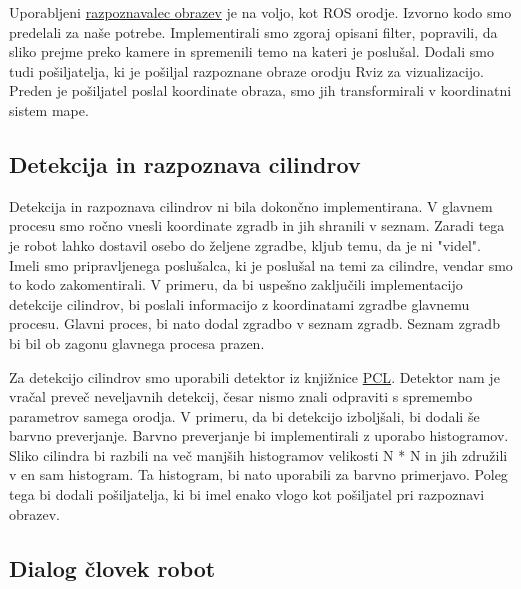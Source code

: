 \documentclass[a4paper,11pt]{article}
\begin{document}
Uporabljeni \href{http://wiki.ros.org/face_recognition}{razpoznavalec obrazev} je na voljo, kot ROS orodje. Izvorno kodo smo predelali za naše potrebe. Implementirali smo zgoraj opisani filter, popravili, da sliko prejme preko kamere in spremenili temo na kateri je poslušal. Dodali smo tudi pošiljatelja, ki je pošiljal razpoznane obraze orodju Rviz za vizualizacijo. Preden je pošiljatel poslal koordinate obraza, smo jih transformirali v koordinatni sistem mape.

\subsection{Detekcija in razpoznava cilindrov}

Detekcija in razpoznava cilindrov ni bila dokončno implementirana. V glavnem procesu smo ročno vnesli koordinate zgradb in jih shranili v seznam. Zaradi tega je robot lahko dostavil osebo do željene zgradbe, kljub temu, da je ni "videl". Imeli smo pripravljenega poslušalca, ki je poslušal na temi za cilindre, vendar smo to kodo zakomentirali. V primeru, da bi uspešno zaključili implementacijo detekcije cilindrov, bi poslali informacijo z koordinatami zgradbe glavnemu procesu. Glavni proces, bi nato dodal zgradbo v seznam zgradb. Seznam zgradb bi bil ob zagonu glavnega procesa prazen.

Za detekcijo cilindrov smo uporabili detektor iz knjižnice \href{http://pointclouds.org/documentation/tutorials/cylinder_segmentation.php}{PCL}. Detektor nam je vračal preveč neveljavnih detekcij, česar nismo znali odpraviti s spremembo parametrov samega orodja. V primeru, da bi detekcijo izboljšali, bi dodali še barvno preverjanje. Barvno preverjanje bi implementirali z uporabo histogramov. Sliko cilindra bi razbili na več manjših histogramov velikosti N * N in jih združili v en sam histogram. Ta histogram, bi nato uporabili za barvno primerjavo. Poleg tega bi dodali pošiljatelja, ki bi imel enako vlogo kot pošiljatel pri razpoznavi obrazev.

\subsection{\label{sec:dialog} Dialog človek robot}
\end{document}
